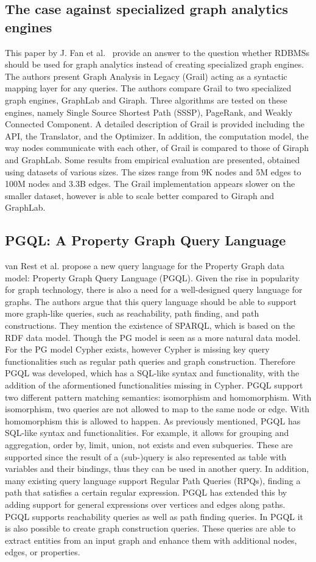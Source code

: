 \subsection{The case against specialized graph analytics engines}
This paper by J. Fan et al.~\cite{Fan2015TheCA} provide an answer to the question whether RDBMSs should be used for graph analytics instead of creating specialized graph engines. The authors present Graph Analysis in Legacy (Grail) acting as a syntactic mapping layer for any queries. The authors compare Grail to two specialized graph engines, GraphLab and Giraph. Three algorithms are tested on these engines, namely Single Source Shortest Path (SSSP), PageRank, and Weakly Connected Component. A detailed description of Grail is provided including the API, the Translator, and the Optimizer. In addition, the computation model, the way nodes communicate with each other, of Grail is compared to those of Giraph and GraphLab. Some results from empirical evaluation are presented, obtained using datasets of various sizes. The sizes range from 9K nodes and 5M edges to 100M nodes and 3.3B edges. The Grail implementation appears slower on the smaller dataset, however is able to scale better compared to Giraph and GraphLab. 
\subsection{PGQL: A Property Graph Query Language}
van Rest et al. propose\cite{10.1145/2960414.2960421} a new query language for the Property Graph data model: Property Graph Query Language (PGQL). Given the rise in popularity for graph technology, there is also a need for a well-designed query language for graphs. The authors argue that this query language should be able to support more graph-like queries, such as reachability, path finding, and path constructions. They mention the existence of SPARQL, which is based on the RDF data model. Though the PG model is seen as a more natural data model. For the PG model Cypher exists, however Cypher is missing key query functionalities such as regular path queries and graph construction. Therefore PGQL was developed, which has a SQL-like syntax and functionality, with the addition of the aformentioned functionalities missing in Cypher. 
PGQL support two different pattern matching semantics: isomorphism and homomorphism. With isomorphism, two queries are not allowed to map to the same node or edge. With homomorphism this is allowed to happen. 
As previously mentioned, PGQL has SQL-like syntax and functionalities. For example, it allows for grouping and aggregation, order by, limit, union, not exists and even subqueries. These are supported since the result of a (sub-)query is also represented as table with variables and their bindings, thus they can be used in another query. 
In addition, many existing query language support Regular Path Queries (RPQs), finding a path that satisfies a certain regular expression. PGQL has extended this by adding support for general expressions over vertices and edges along paths. PGQL supports reachability queries as well as path finding queries. In PGQL it is also possible to create graph construction queries. These queries are able to extract entities from an input graph and enhance them with additional nodes, edges, or properties. 

